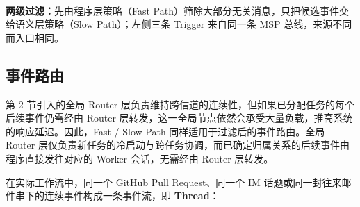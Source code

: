 \documentclass[11pt,a4paper,UTF8,fontset=windows]{ctexart}
\begin{document}
\begin{itemize}
\begin{center}
\\[0.3em]
  {\footnotesize\color{dagray}\textbf{两级过滤：}先由程序层策略（Fast Path）筛除大部分无关消息，只把候选事件交给语义层策略（Slow Path）；左侧三条 Trigger 来自同一条 MSP 总线，来源不同而入口相同。}
  \end{center}
\end{itemize}

\subsection{事件路由}

第 2 节引入的全局 Router 层负责维持跨信道的连续性，但如果已分配任务的每个后续事件仍需经由 Router 层转发，这一全局节点依然会承受大量负载，推高系统的响应延迟。因此，Fast / Slow Path 同样适用于过滤后的事件路由。全局 Router 层仅负责新任务的冷启动与跨任务协调，而已确定归属关系的后续事件由程序直接发往对应的 Worker 会话，无需经由 Router 层转发。

在实际工作流中，同一个 GitHub Pull Request、同一个 IM 话题或同一封往来邮件串下的连续事件构成一条事件流，即 \textbf{Thread}：
\end{document}

